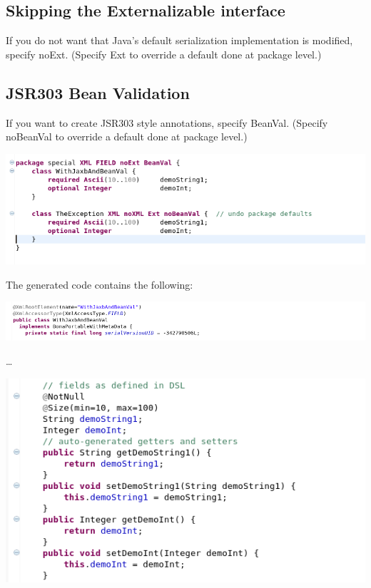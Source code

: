\documentclass[11pt,a4paper,oneside]{article}
\begin{document}
\subsection{Skipping the {\ttfamily Externalizable} interface}
If you do not want that Java's default serialization implementation is modified, specify {\ttfamily noExt}. (Specify {\ttfamily Ext} to
override a default done at package level.)

\subsection{JSR303 Bean Validation}
If you want to create JSR303 style annotations, specify {\ttfamily BeanVal}. (Specify {\ttfamily noBeanVal} to
override a default done at package level.)

\vspace{2mm}

\hspace{1cm}\includegraphics[scale=0.5]{images/tut1-012-special.png}

\noindent The generated code contains the following:

\vspace{2mm}

\hspace{1cm}\includegraphics[scale=0.5]{images/tut1-012-special-1.png}

\ldots

\vspace{2mm}

\hspace{1cm}\includegraphics[scale=0.5]{images/tut1-012-special-2.png}
\end{document}
